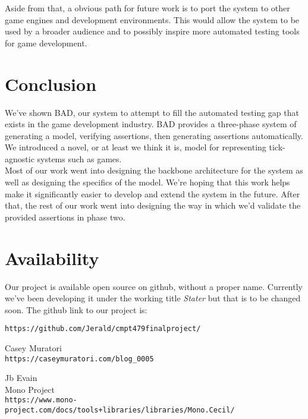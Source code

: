 \documentclass[letterpaper,twocolumn,10pt]{article}
\begin{document}
Aside from that, a obvious path for future work is to port the system to other game engines and development environments. This would allow the system to be used by a broader audience and to possibly inspire more automated testing tools for game development.

\section{Conclusion}

We've shown BAD, our system to attempt to fill the automated testing gap that exists in the game development industry. BAD provides a three-phase system of generating a model, verifying assertions, then generating assertions automatically. We introduced a novel, or at least we think it is, model for representing tick-agnostic systems such as games.\\

Most of our work went into designing the backbone architecture for the system as well as designing the specifics of the model. We're hoping that this work helps make it significantly easier to develop and extend the system in the future. After that, the rest of our work went into designing the way in which we'd validate the provided assertions in phase two.

\section{Availability}

Our project is available open source on github, without a proper name. Currently we've been developing it under the working title \textit{Stater} but that is to be changed soon. The github link to our project is:
\begin{center}
{\tt https://github.com/Jerald/cmpt479finalproject/}\\
\end{center}

\begin{thebibliography}{9}
    Casey Muratori\\
    \texttt{https://caseymuratori.com/blog\_0005}

    Jb Evain\\
    Mono Project\\
    \texttt{https://www.mono-project.com/docs/tools+libraries/libraries/Mono.Cecil/}
\end{thebibliography}






\theendnotes
\end{document}
